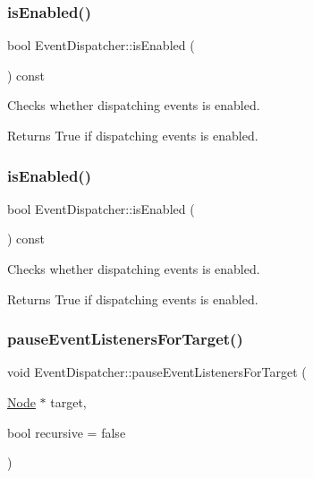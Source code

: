 \subsubsection{\texorpdfstring{is\+Enabled()}{isEnabled()}\hspace{0.1cm}{\footnotesize\ttfamily [1/2]}}
{\footnotesize\ttfamily bool Event\+Dispatcher\+::is\+Enabled (\begin{DoxyParamCaption}{ }\end{DoxyParamCaption}) const}

Checks whether dispatching events is enabled.

\begin{DoxyReturn}{Returns}
True if dispatching events is enabled. 
\end{DoxyReturn}
\mbox{\label{classEventDispatcher_a5350c4316fd57701602cb7d9f5fb8535}} 
\subsubsection{\texorpdfstring{is\+Enabled()}{isEnabled()}\hspace{0.1cm}{\footnotesize\ttfamily [2/2]}}
{\footnotesize\ttfamily bool Event\+Dispatcher\+::is\+Enabled (\begin{DoxyParamCaption}{ }\end{DoxyParamCaption}) const}

Checks whether dispatching events is enabled.

\begin{DoxyReturn}{Returns}
True if dispatching events is enabled. 
\end{DoxyReturn}
\mbox{\label{classEventDispatcher_a33dbf3057a30a92f741fd1465b70363f}} 
\subsubsection{\texorpdfstring{pause\+Event\+Listeners\+For\+Target()}{pauseEventListenersForTarget()}\hspace{0.1cm}{\footnotesize\ttfamily [1/2]}}
{\footnotesize\ttfamily void Event\+Dispatcher\+::pause\+Event\+Listeners\+For\+Target (\begin{DoxyParamCaption}\item[{\hyperlink{classNode}{Node} $\ast$}]{target,  }\item[{bool}]{recursive = {\ttfamily false} }\end{DoxyParamCaption})}

